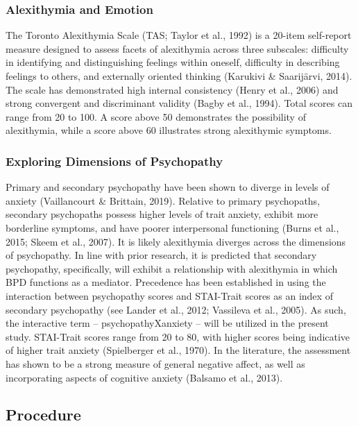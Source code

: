 \documentclass[
  man,floatsintext]{apa7}
\begin{document}
\hypertarget{alexithymia-and-emotion}{%
\subsubsection{Alexithymia and Emotion}\label{alexithymia-and-emotion}}

The Toronto Alexithymia Scale (TAS; Taylor et al., 1992) is a 20-item self-report measure designed to assess facets of alexithymia across three subscales: difficulty in identifying and distinguishing feelings within oneself, difficulty in describing feelings to others, and externally oriented thinking (Karukivi \& Saarijärvi, 2014). The scale has demonstrated high internal consistency (Henry et al., 2006) and strong convergent and discriminant validity (Bagby et al., 1994). Total scores can range from 20 to 100. A score above 50 demonstrates the possibility of alexithymia, while a score above 60 illustrates strong alexithymic symptoms.

\hypertarget{exploring-dimensions-of-psychopathy}{%
\subsubsection{Exploring Dimensions of Psychopathy}\label{exploring-dimensions-of-psychopathy}}

Primary and secondary psychopathy have been shown to diverge in levels of anxiety (Vaillancourt \& Brittain, 2019). Relative to primary psychopaths, secondary psychopaths possess higher levels of trait anxiety, exhibit more borderline symptoms, and have poorer interpersonal functioning (Burns et al., 2015; Skeem et al., 2007). It is likely alexithymia diverges across the dimensions of psychopathy. In line with prior research, it is predicted that secondary psychopathy, specifically, will exhibit a relationship with alexithymia in which BPD functions as a mediator. Precedence has been established in using the interaction between psychopathy scores and STAI-Trait scores as an index of secondary psychopathy (see Lander et al., 2012; Vassileva et al., 2005). As such, the interactive term -- psychopathyXanxiety -- will be utilized in the present study. STAI-Trait scores range from 20 to 80, with higher scores being indicative of higher trait anxiety (Spielberger et al., 1970). In the literature, the assessment has shown to be a strong measure of general negative affect, as well as incorporating aspects of cognitive anxiety (Balsamo et al., 2013).

\hypertarget{procedure}{%
\subsection{Procedure}\label{procedure}}
\end{document}

